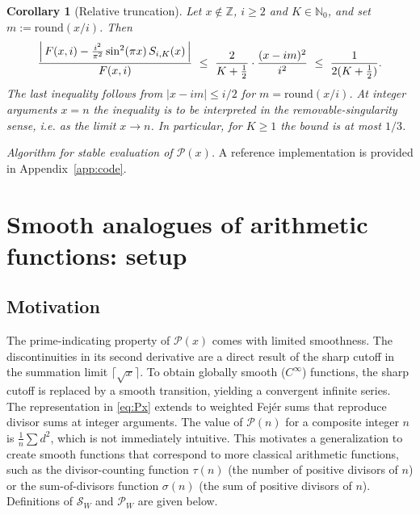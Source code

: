 \documentclass[11pt,a4paper]{amsart}
\theoremstyle{plain}
\newtheorem{corollary}[theorem]{Corollary}
\theoremstyle{definition}
\theoremstyle{remark}
\begin{document}
\begin{corollary}[Relative truncation]\label{cor:RPF-relative}
Let $x\notin\mathbb Z$, $i\ge 2$ and $K\in\mathbb N_0$, and set $m:=\mathrm{round}(x/i)$. Then
\[
\frac{\Bigl|\,F(x,i)-\frac{i^{2}}{\pi^{2}}\sin^{2}(\pi x)\,S_{i,K}(x)\,\Bigr|}{F(x,i)}
\ \le\ \frac{2}{K+\tfrac12}\cdot\frac{(x-i m)^2}{i^2}
\ \le\ \frac{1}{2(K+\tfrac12)}.
\]
The last inequality follows from $|x-i m|\le i/2$ for $m=\mathrm{round}(x/i)$. At integer arguments $x=n$ the inequality is to be interpreted in the removable-singularity sense, i.e. as the limit $x\to n$. In particular, for $K\ge 1$ the bound is at most $1/3$.
\end{corollary}


\noindent\textit{Algorithm for stable evaluation of $\mathcal{P}(x)$.} A reference implementation is provided in Appendix~\ref{app:code}.

\section{Smooth analogues of arithmetic functions: setup}

\subsection{Motivation}
The prime-indicating property of $\mathcal{P}(x)$ comes with limited smoothness.
The discontinuities in its second derivative are a direct result of the sharp cutoff in the summation limit $\lceil\sqrt{x}\rceil$.
To obtain globally smooth ($C^\infty$) functions, the sharp cutoff is replaced by a smooth transition, yielding a convergent infinite series.
The representation in \eqref{eq:Px} extends to weighted Fejér sums that reproduce divisor sums at integer arguments.
The value of $\mathcal{P}(n)$ for a composite integer $n$ is $\frac{1}{n}\sum d^2$, which is not immediately intuitive.
This motivates a generalization to create smooth functions that correspond to more classical arithmetic functions, such as the divisor-counting function $\tau(n)$ (the number of positive divisors of $n$) or the sum-of-divisors function $\sigma(n)$ (the sum of positive divisors of $n$).
Definitions of $\mathcal{S}_W$ and $\mathcal{P}_W$ are given below.
\end{document}
